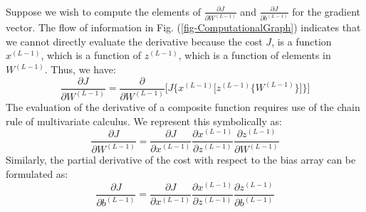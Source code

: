 \documentclass[12pt,letterpaper]{article}
\begin{document}
\paragraph*{}Suppose we wish to compute the elements of $\frac{\partial J}{\partial W^{(L-1)}}$ and $\frac{\partial J}{\partial b^{(L-1)}}$ for the gradient vector. The flow of information in Fig. (\ref{fig-ComputationalGraph}) indicates that we cannot directly evaluate the derivative because the cost $J$, is a function $x^{(L-1)}$, which is a function of $z^{(L-1)}$, which is a function of elements in $W^{(L-1)}$. Thus, we have:
\begin{equation}
\frac{\partial J}{\partial W^{(L-1)}} = \frac{\partial}{\partial W^{(L-1)}}
\Bigg[ J \bigg\{ x^{(L-1)} \Big[ z^{(L-1)}  \big\{ W^{(L-1)} 
\big\} \Big] \bigg\} \Bigg]
\end{equation}
The evaluation of the derivative of a composite function requires use of the chain rule of multivariate calculus. We represent this symbolically as:
\begin{equation}
\label{eqn-dWL1}
\frac{\partial J}{\partial W^{(L-1)}} = 
\frac{\partial J}{\partial x^{(L-1)}}\frac{\partial x^{(L-1)}}{\partial z^{(L-1)}}\frac{\partial z^{(L-1)}}{\partial W^{(L-1)}}
\end{equation}
Similarly, the partial derivative of the cost with respect to the bias array can be formulated as:
\begin{equation}
\label{eqn-dbL1}
\frac{\partial J}{\partial b^{(L-1)}} = 
\frac{\partial J}{\partial x^{(L-1)}}\frac{\partial x^{(L-1)}}{\partial z^{(L-1)}}\frac{\partial z^{(L-1)}}{\partial b^{(L-1)}}
\end{equation}
\end{document}
